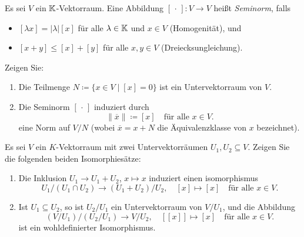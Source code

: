 \documentclass[a4paper,10pt]{scrartcl}
\begin{document}
\begin{question}
  Es sei $V$ ein $\mathbb{K}$-Vektorraum.
  Eine Abbildung $[\,\cdot\,] \colon V \to V$ heißt \emph{Seminorm}, falls
  \begin{itemize}
    \item
      $[\lambda x] = |\lambda| [x]$ für alle $\lambda \in \mathbb{K}$ und $x \in V$ (Homogenität), und
    \item
      $[x + y] \leq [x] + [y]$ für alle $x, y \in V$ (Dreiecksungleichung).
  \end{itemize}
  Zeigen Sie:
  \begin{enumerate}[leftmargin=*]
    \item
      Die Teilmenge $N \coloneqq \{x \in V \mid [x] = 0\}$ ist ein Untervektorraum von $V$.
    \item
      Die Seminorm $[\,\cdot\,]$ induziert durch
      \[
        \| \overline{x} \| \coloneqq [x]
        \quad
        \text{für alle $x \in V$}.
      \]
      eine Norm auf $V\!/N$ (wobei $\overline{x} = x + N$ die Äquivalenzklasse von $x$ bezeichnet).
  \end{enumerate}
\end{question}


\begin{question}
  Es sei $V$ ein $K$-Vektorraum mit zwei Untervektorräumen $U_1, U_2 \subseteq V$.
  Zeigen Sie die folgenden beiden Isomorphiesätze:
  \begin{enumerate}[leftmargin=*]
    \item
      Die Inklusion $U_1 \to U_1 + U_2$, $x \mapsto x$ induziert einen isomorphismus
      \[
        U_1 / (U_1 \cap U_2) \to (U_1 + U_2) / U_2,
        \quad
        [x] \mapsto [x]
        \quad
        \text{für alle $x \in V$}.
      \]
    \item
      Ist $U_1 \subseteq U_2$, so ist $U_2 / U_1$ ein Untervektorraum von $V / U_1$, und die Abbildung
      \[
        (V / U_1) / (U_2 / U_1) \to V / U_2,
        \quad
        [[x]] \mapsto [x]
        \quad
        \text{für alle $x \in V$}.
      \]
      ist ein wohldefinierter Isomorphismus.
  \end{enumerate}
\end{question}
\end{document}
